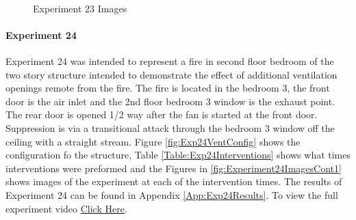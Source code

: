 \documentclass{article}
\begin{document}
\begin{figure}[H]
	\ContinuedFloat 
	\centering 
	 \ 
	\caption{Experiment 23 Images}
	\label{fig:Experiment23ImagesCont3} 
\end{figure}

\paragraph{Experiment 24}\mbox{}

Experiment 24 was intended to represent a fire in second floor bedroom of the two story structure intended to demonstrate the effect of additional ventilation openings remote from the fire. The fire is located in the bedroom 3, the front door is the air inlet and the 2nd floor bedroom 3 window is the exhaust point. The rear door is opened 1/2 way after the fan is started at the front door. Suppression is via a transitional attack through the bedroom 3 window off the ceiling with a straight stream. Figure \ref{fig:Exp24VentConfig} shows the configuration fo the structure, Table \ref{Table:Exp24Interventions} shows what times interventions were preformed and the Figures in \ref{fig:Experiment24ImagesCont1} shows images of the experiment at each of the intervention times. The results of Experiment 24 can be found in Appendix \ref{App:Exp24Results}. To view the full experiment video \href{https://youtu.be/T430FepUd4E}{Click Here}.
\end{document}
